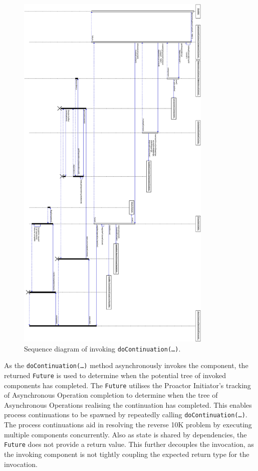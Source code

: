 \documentclass[prodmode]{style/acmlarge}
\begin{document}
\begin{figure}[!t]
\centering
\includegraphics[height=7in]{DoContinuationSequenceDiagram}
\caption{Sequence diagram of invoking \texttt{doContinuation(\ldots)}.}
\label{fig:DoContinuationSequenceDiagram}
\end{figure}
 
As the \texttt{doContinuation(\ldots)} method asynchronously invokes the
component, the returned \texttt{Future} is used to determine when the potential
tree of invoked components has completed.  The \texttt{Future} utilises the
Proactor Initiator's tracking of Asynchronous Operation completion to determine
when the tree of Asynchronous Operations realising the continuation has
completed.  This enables process continuations \cite{process-continuation} to be
spawned by repeatedly calling \texttt{doContinuation(\ldots)}.  The process
continuations aid in resolving the reverse 10K problem
\cite{reverse-ten-k-problem} by executing multiple components concurrently.
Also as state is shared by dependencies, the \texttt{Future} does not provide a
return value.  This further decouples the invocation, as the invoking component
is not tightly coupling the expected return type for the invocation.
\end{document}
